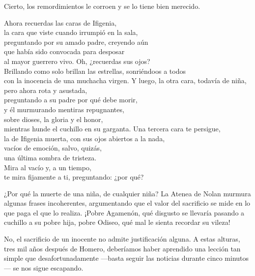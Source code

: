 Cierto, los remordimientos le corroen y se lo tiene bien merecido.

\begin{versopropio}
Ahora recuerdas las caras de Ifigenia,\\
la cara que viste cuando irrumpió en la sala,\\
preguntando por su amado padre, creyendo aún\\
que había sido convocada para desposar\\
al mayor guerrero vivo. Oh, ¿recuerdas sus ojos?\\
Brillando como solo brillan las estrellas, sonriéndoos a todos\\
con la inocencia de una muchacha virgen.
\stanzabreak
Y luego, la otra cara, todavía de niña,\\
pero ahora rota y asustada,\\
preguntando a su padre por qué debe morir,\\
y él murmurando mentiras repugnantes,\\
sobre dioses, la gloria y el honor,\\
mientras hunde el cuchillo en su garganta.
\stanzabreak
Una tercera cara te persigue,\\
la de Ifigenia muerta, con sus ojos abiertos a la nada,\\
vacíos de emoción, salvo, quizás,\\
una última sombra de tristeza.\\
Mira al vacío y, a un tiempo,\\
te mira fijamente a ti, preguntando: ¿por qué?
\end{versopropio}

¿Por qué la muerte de una niña, de cualquier niña? La Atenea de Nolan murmura algunas frases incoherentes, argumentando que el valor del sacrificio se mide en lo que paga el que lo realiza. ¡Pobre Agamenón, qué disgusto se llevaría pasando a cuchillo a su pobre hija, pobre Odiseo, qué mal le sienta recordar su vileza!

No, el sacrificio de un inocente no admite justificación alguna. A estas alturas, tres mil años después de Homero, deberíamos haber aprendido una lección tan simple que desafortunadamente ---basta seguir las noticias durante cinco minutos--- se nos sigue escapando.
